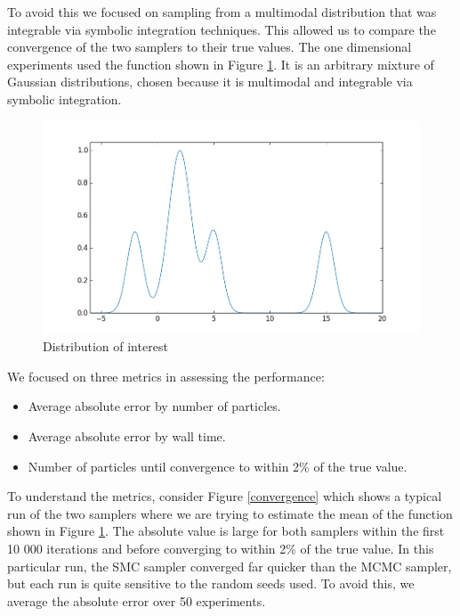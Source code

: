 \documentclass[12pt]{elsarticle}
\begin{document}
To avoid this we focused on sampling from a multimodal distribution that was integrable via symbolic integration techniques. This allowed us to compare the convergence of the two samplers to their true values. The one dimensional experiments used the function shown in Figure \ref{function}. It is an arbitrary mixture of Gaussian distributions, chosen because it is multimodal and integrable via symbolic integration.

\begin{figure}[htbp]
\begin{center}
\includegraphics[width = \textwidth]{plots/function.png}
\caption{Distribution of interest}
\label{function}
\end{center}
\end{figure}

We focused on three metrics in assessing the performance:
\begin{itemize}
\item Average absolute error by number of particles. 
\item Average absolute error by wall time. 
\item Number of particles until convergence to within 2\% of the true value. 
\end{itemize}

To understand the metrics, consider Figure \ref{convergence} which shows a typical run of the two samplers where we are trying to estimate the mean of the function shown in Figure \ref{function}. The absolute value is large for both samplers within the first 10 000 iterations and before converging to within 2\% of the true value. In this particular run, the SMC sampler converged far quicker than the MCMC sampler, but each run is quite sensitive to the random seeds used. To avoid this, we average the absolute error over 50 experiments. \\
\end{document}
